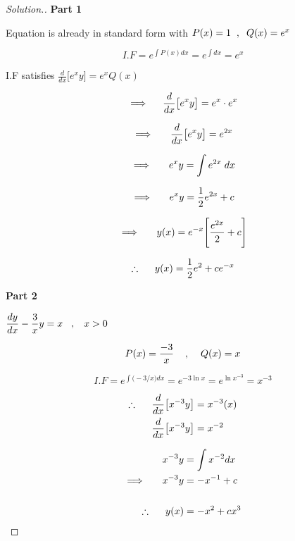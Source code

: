 \documentclass[11pt,a4paper]{article}
\theoremstyle{definition}
\newenvironment{solution}
  {\renewcommand{\qedsymbol}{}\begin{proof}[\textit{Solution}.]}
  {\end{proof}}
\newcommand{\subhead}[1]{%
  \par\medskip\noindent\textbf{#1}\par\nobreak\smallskip}
\begin{document}
\begin{solution}
\subhead{Part 1}
Equation is already in standard form with $P(x) = 1 \hspace{0.2cm}  , \hspace{0.2cm} Q(x) = e^x$

$$I.F = e^{\int P(x)dx} = e^{\int dx} = e^x$$

I.F satisfies $\displaystyle{\frac{d}{dx}\big[e^xy\big] = e^x Q(x)}$

$$\implies\hspace{0.4cm} \frac{d}{dx}\big[e^xy\big] = e^x\cdot e^x$$

$$\implies \hspace{0.5cm} \frac{d}{dx}\big[e^xy\big] = e^{2x}$$

$$\implies \hspace{0.5cm} e^xy = \int e^{2x}\hspace{0.1cm}dx$$

$$\implies\hspace{0.5cm} e^xy = \dfrac{1}{2}e^{2x} + c$$

$$\implies \hspace{0.5cm} y(x) = e^{-x}\Bigg[\dfrac{e^{2x}}{2} + c\Bigg]$$

$$\therefore \hspace{0.5cm} y(x) = \frac{1}{2}e^2 + ce^{-x}$$

\subhead{Part 2}
$\displaystyle{\frac{dy}{dx} - \frac{3}{x} y = x\hspace{0.3cm} , \hspace{0.3cm} x>0}$

$$P(x) = \frac{-3}{x}\hspace{0.4cm} , \hspace{0.4cm} Q(x) = x$$

$$I.F = e^{\int \big(-3/x\big)dx} = e^{-3\ln x} = e^{\ln x^{-3}} =x^{-3}$$

\begin{align*}
\therefore\hspace{0.5cm} \frac{d}{dx}\big[x^{-3}y\big] & = x^{-3} (x)\\
\frac{d}{dx}\big[x^{-3}y\big] & = x^{-2}
\end{align*}

\begin{align*}
x^{-3}y & = \int x^{-2} dx\\
\implies\hspace{0.5cm} x^{-3}y & = -x^{-1} + c\\\\
\therefore\hspace{0.5cm} y(x) & = -x^2 + cx^3\\
\end{align*}
\end{solution}
\end{document}
